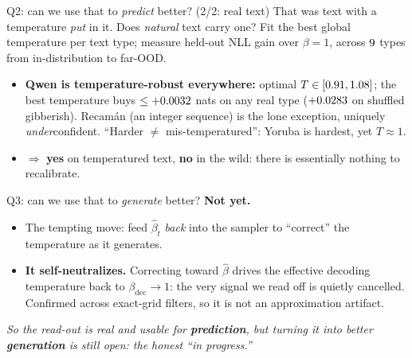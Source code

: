 \documentclass[aspectratio=169]{beamer}
\begin{document}
\begin{frame}{Q2: can we use that to \emph{predict} better?  (2/2: real text)}
  \footnotesize That was text with a temperature \emph{put} in it. Does \emph{natural}
  text carry one? Fit the best global temperature per text type; measure held-out NLL
  gain over $\beta{=}1$, across $9$ types from in-distribution to far-OOD.
  \begin{center}\footnotesize
    
  \end{center}
  \vspace{0.1em}
  \footnotesize
  \begin{itemize}
    \item \textbf{Qwen is temperature-robust everywhere:} optimal
      $T\in[0.91,1.08]$; the best temperature buys
      $\le+0.0032$ nats on any real type ($+0.0283$
      on shuffled gibberish). Recam\'an (an integer sequence) is the lone exception,
      uniquely \emph{under}confident. ``Harder $\ne$ mis-temperatured'': Yoruba is
      hardest, yet $T\!\approx\!1$.
    \item $\Rightarrow$ \textbf{yes} on temperatured text, \textbf{no} in the wild:
      there is essentially nothing to recalibrate.
  \end{itemize}
\end{frame}

\begin{frame}{Q3: can we use that to \emph{generate} better?  \textbf{Not yet.}}
  \begin{itemize}
    \item The tempting move: feed $\hat\beta_t$ \emph{back} into the sampler to
      ``correct'' the temperature as it generates.
    \item \textbf{It self-neutralizes.} Correcting toward $\hat\beta$ drives the
      effective decoding temperature back to $\beta_{\mathrm{dec}}\to1$: the very
      signal we read off is quietly cancelled. Confirmed across exact-grid filters, so
      it is not an approximation artifact.
  \end{itemize}
  \vfill
  \centering\emph{So the read-out is real and usable for \textbf{prediction}, but
  turning it into better \textbf{generation} is still open: the honest ``in progress.''}
\end{frame}
\end{document}
